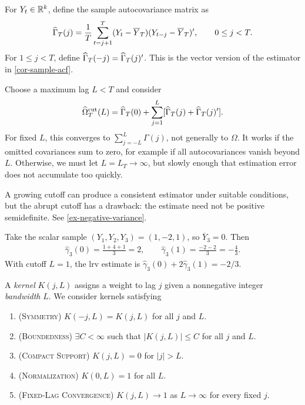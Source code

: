 \documentclass[a4paper,12pt]{article}
\begin{document}
\begin{definition}
	For $Y_t\in\mathbb{R}^k$, define the sample autocovariance matrix as
	\begin{align}
		\widehat\Gamma_T(j)=\frac1T\sum_{t=j+1}^T (Y_t-\overline Y_T)(Y_{t-j}-\overline Y_T)^{\prime},
		\qquad 0\le j<T.
	\end{align}
	For $1\le j<T$, define $\widehat\Gamma_T(-j)=\widehat\Gamma_T(j)^{\prime}$.
	This is the vector version of the estimator in \autoref{cor-sample-acf}.
\end{definition}

\begin{remark}
	Choose a maximum lag $L<T$ and consider
	\begin{align}\label{eq-lrv-truncated}
		\widehat\Omega_T^{\mathrm{cut}}(L)
		=\widehat\Gamma_T(0)+\sum_{j=1}^{L}
		[\widehat\Gamma_T(j)+\widehat\Gamma_T(j)^{\prime}].
	\end{align}
	For fixed $L$, this converges to $\sum_{j=-L}^{L}\Gamma(j)$, not generally to $\Omega$.
	It works if the omitted covariances sum to zero, for example if all autocovariances vanish beyond $L$.
	Otherwise, we must let $L=L_T\to\infty$, but slowly enough that estimation error does not accumulate too quickly.
\end{remark}

\begin{remark}
	A growing cutoff can produce a consistent estimator under suitable conditions,
	but the abrupt cutoff has a drawback: the estimate need not be positive semidefinite.
	See \autoref{ex-negative-variance}.
\end{remark}

\begin{example}\label{ex-negative-variance}
	Take the scalar sample $(Y_1,Y_2,Y_3)=(1,-2,1)$, so $\overline Y_3=0$.
	Then
	\begin{align*}
		\widehat\gamma_3(0)=\frac{1+4+1}{3}=2,
		\qquad \widehat\gamma_3(1)=\frac{-2-2}{3}=-\frac43.
	\end{align*}
	With cutoff $L=1$, the \gls{lrv} estimate is
	$\widehat\gamma_3(0)+2\widehat\gamma_3(1)=-2/3$.
\end{example}

\begin{definition}[Kernel]
	A \emph{kernel} $K(j,L)$ assigns a weight to lag $j$ given a nonnegative integer \emph{bandwidth} $L$.
	We consider kernels satisfying
	\begin{enumerate}
		\item(\textsc{Symmetry}) $K(-j,L)=K(j,L)$ for all $j$ and $L$.
		\item(\textsc{Boundedness}) $\exists C<\infty$ such that $|K(j,L)|\le C$ for all $j$ and $L$.
		\item(\textsc{Compact Support}) $K(j,L)=0$ for $|j|>L$.
		\item(\textsc{Normalization}) $K(0,L)=1$ for all $L$.
		\item(\textsc{Fixed-Lag Convergence}) $K(j,L)\to1$ as $L\to\infty$ for every fixed $j$.
	\end{enumerate}
\end{definition}
\end{document}
